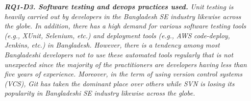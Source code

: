 \begin{tcolorbox}[flushleft upper,boxrule=1pt,arc=0pt,left=0pt,right=0pt,top=0pt,bottom=0pt,colback=white,after=\ignorespacesafterend\par\noindent]
\nd\it{\bf{RQ1-D3. Software testing and devops practices used.}} Unit testing is heavily carried out by developers in the Bangladesh SE industry likewise across the globe. In addition, there has a high demand for various software testing tools (e.g., XUnit, Selenium, etc.) and deployment tools (e.g., AWS code-deploy, Jenkins, etc.) in Bangladesh. However, there is a tendency among most Bangladeshi developers not to use these automated tools regularly that is not unexpected since the majority of the practitioners are developers having less than five years of experience. Moreover, in the term of using version control systems (VCS), Git has taken the dominant place over others while SVN is losing its popularity in Bangladeshi SE industry likewise across the globe.
 
\end{tcolorbox}
